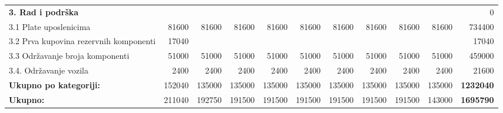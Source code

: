 \documentclass[12pt]{article}
\begin{document}
\begin{landscape}
\begin{table}[htbp]
\begin{tabular}{lrrrrrrrrrr}
    \midrule
    \textbf{3. Rad i podrška} &       &       &       &       &       &       &       &       &       & 0 \\
    3.1 Plate uposlenicima & 81600 & 81600 & 81600 & 81600 & 81600 & 81600 & 81600 & 81600 & 81600 & 734400 \\
    \multicolumn{1}{p{14.715em}}{3.2 Prva kupovina rezervnih\newline{} komponenti} & 17040 &       &       &       &       &       &       &       &       & 17040 \\
    3.3 Održavanje broja komponenti & 51000 & 51000 & 51000 & 51000 & 51000 & 51000 & 51000 & 51000 & 51000 & 459000 \\
    3.4. Održavanje vozila & 2400  & 2400  & 2400  & 2400  & 2400  & 2400  & 2400  & 2400  & 2400  & 21600 \\
    \midrule
    \textbf{Ukupno po kategoriji:} & 152040 & 135000 & 135000 & 135000 & 135000 & 135000 & 135000 & 135000 & 135000 & \textbf{1232040} \\
    \midrule
    \textbf{Ukupno:} & 211040 & 192750 & 191500 & 191500 & 191500 & 191500 & 191500 & 191500 & 143000 & \textbf{1695790} \\

    \bottomrule
    \end{tabular}%
  \label{rj1_100}%
\end{table}%

\end{landscape}
\end{document}
